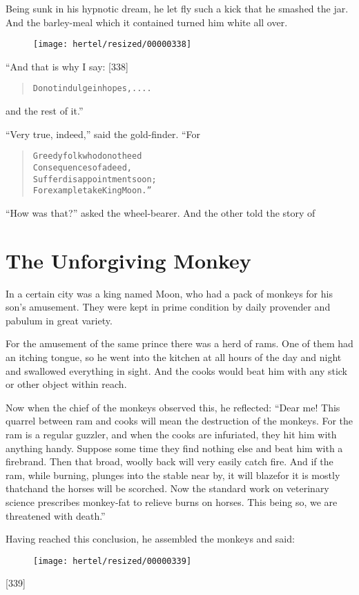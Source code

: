 \documentclass[article, twoside, 10pt]{memoir}
\renewenvironment{verbatim}{%
\begin{quote}%
\vskip -10pt%
\begin{alltt}\normalfont\small}{\end{alltt}%
\end{quote}%
\vskip -10pt
} %
\begin{document}
Being sunk in his hypnotic dream, he let fly such a kick that he
smashed the jar. And the barley-meal which it contained turned him
white all over.

\begin{figure}[p]\texttt{[image: hertel/resized/00000338]}\end{figure}“And that is why I say: [338]

\begin{verbatim}
Do not indulge in hopes, ....
\end{verbatim}
and the rest of it.”

``Very true, indeed,'' said the gold-finder. “For

\begin{verbatim}
Greedy folk who do not heed
Consequences of a deed,
Suffer disappointment soon;
For example take King Moon.”
\end{verbatim}
``How was that?'' asked the wheel-bearer. And the other told the
story of

\chapter{The Unforgiving Monkey}

In a certain city was a king named Moon, who had a pack of monkeys
for his son's amusement. They were kept in prime condition by daily
provender and pabulum in great variety.

For the amusement of the same prince there was a herd of rams. One
of them had an itching tongue, so he went into the kitchen at all
hours of the day and night and swallowed everything in sight. And
the cooks would beat him with any stick or other object within
reach.

Now when the chief of the monkeys observed this, he reflected:
``Dear me! This quarrel between ram and cooks will mean the destruction of the monkeys. For the ram is a regular guzzler, and when the cooks are infuriated, they hit him with anything handy. Suppose some time they find nothing else and beat him with a firebrand. Then that broad, woolly back will very easily catch fire. And if the ram, while burning, plunges into the stable near by, it will blaze{\textemdash}for it is mostly thatch{\textemdash}and the horses will be scorched. Now the standard work on veterinary science prescribes monkey-fat to relieve burns on horses. This being so, we are threatened with death.''

Having reached this conclusion, he assembled the monkeys and said:
\begin{figure}[p]\texttt{[image: hertel/resized/00000339]}\end{figure}[339]
\end{document}
